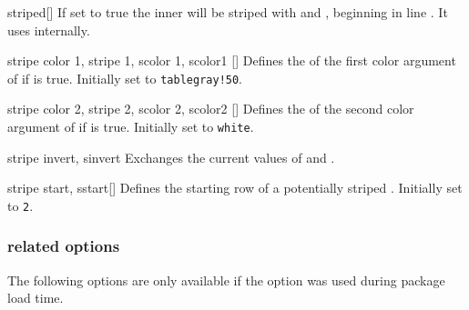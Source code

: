 \begin{describeopt}{striped}[]%
  If set to true the inner  will be striped with  and , beginning in line . It
  uses  internally.
\end{describeopt}%
\begin{describeopt}{stripe color 1, stripe 1, scolor 1, scolor1}%
  []
  Defines the  of the first color argument of  if
   is true. Initially set to \texttt{tablegray!50}.
\end{describeopt}%
\begin{describeopt}{stripe color 2, stripe 2, scolor 2, scolor2}%
  []
  Defines the  of the second color argument of  if
   is true. Initially set to \texttt{white}.
\end{describeopt}%
\begin{describeopt}{stripe invert, sinvert}%
  Exchanges the current values of  and .
\end{describeopt}%
\begin{describeopt}{stripe start, sstart}[]%
  Defines the starting row of a potentially striped . Initially
  set to \texttt{2}.
\end{describeopt}%

\subsubsection{ related options}
The following options are only available if the  option was used
during package load time.

